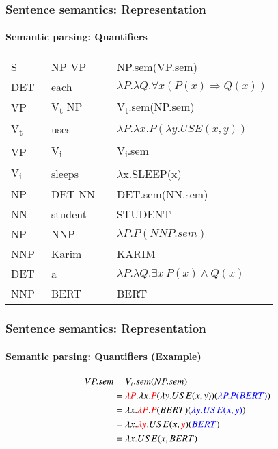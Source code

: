 \documentclass[xcolor=table]{beamer}
\begin{document}
\begin{frame}
	\frametitle{Sentence semantics: Representation}
	\framesubtitle{Semantic parsing: Quantifiers}
	
	\begin{center}
		\small\bfseries
		\begin{tabular}{llll}
			\hline\hline
			S  & \textrightarrow\ NP VP && NP.sem(VP.sem) \\
			DET & \textrightarrow\ each && $\lambda P.\lambda Q.\forall x (P(x) \Rightarrow Q(x))$ \\
			
			VP & \textrightarrow\ V\textsubscript{t} NP && V\textsubscript{t}.sem(NP.sem) \\
			V\textsubscript{t}  & \textrightarrow\ uses && $\lambda P.\lambda x.P(\lambda y.USE(x, y))$ \\
			
			VP & \textrightarrow\ V\textsubscript{i} && V\textsubscript{i}.sem \\
			V\textsubscript{i}  & \textrightarrow\ sleeps && $ \lambda $x.SLEEP(x) \\
			
			NP & \textrightarrow\ DET NN && DET.sem(NN.sem) \\
			NN  & \textrightarrow\  student && STUDENT \\
			
			NP & \textrightarrow\ NNP && $\lambda P.P(NNP.sem)$ \\
			NNP  & \textrightarrow\  Karim && KARIM \\
			
			DET & \textrightarrow\ a && $\lambda P.\lambda Q.\exists x\ P(x) \wedge Q(x)$ \\
			NNP  & \textrightarrow\  BERT && BERT \\
			\hline\hline
		\end{tabular}
	\end{center}
	
\end{frame}

\begin{frame}
	\frametitle{Sentence semantics: Representation}
	\framesubtitle{Semantic parsing: Quantifiers (Example)}
	
	\begin{center}
		\small
		\begin{align*}
			VP.sem & = V_t.sem(NP.sem) \\
			& = \textcolor{red}{\lambda P}.\lambda x.\textcolor{red}{P}(\lambda y.USE(x, y))(\textcolor{blue}{\lambda P.P(BERT)}) \\
			& = \lambda x.\textcolor{red}{\lambda P}.\textcolor{red}{P}(BERT)(\textcolor{blue}{\lambda y.USE(x, y)}) \\
			& = \lambda x.\textcolor{red}{\lambda y}.USE(x, \textcolor{red}{y})(\textcolor{blue}{BERT}) \\
			& = \lambda x.USE(x, BERT) \\
		\end{align*}
	\end{center}
	
\end{frame}
\end{document}
